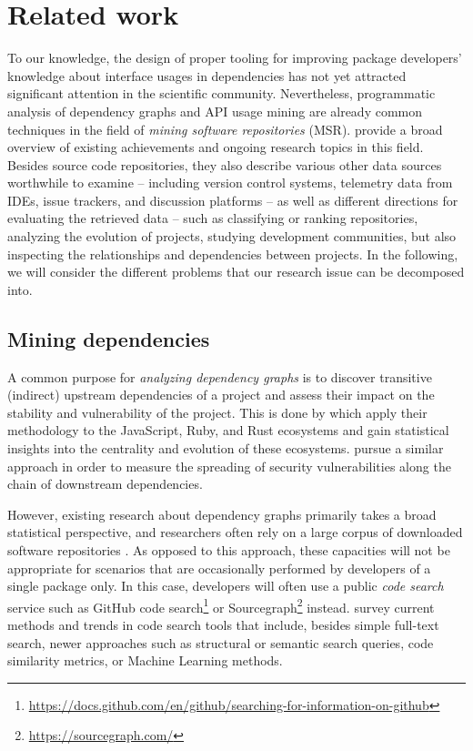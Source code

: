 \section{Related work}
\label{sec:related_work}

To our knowledge, the design of proper tooling for improving package developers' knowledge about interface usages in dependencies has not yet attracted significant attention in the scientific community.
Nevertheless, programmatic analysis of dependency graphs and API usage mining are already common techniques in the field of \emph{mining software repositories} (MSR).
\citet{chaturvedi2013tools} provide a broad overview of existing achievements and ongoing research topics in this field.
Besides source code repositories, they also describe various other data sources worthwhile to examine -- including version control systems, telemetry data from IDEs, issue trackers, and discussion platforms -- as well as different directions for evaluating the retrieved data -- such as classifying or ranking repositories, analyzing the evolution of projects, studying development communities, but also inspecting the relationships and dependencies between projects.
In the following, we will consider the different problems that our research issue can be decomposed into.

\subsection{Mining dependencies}
\label{sec:related_work/dependencies}

A common purpose for \emph{analyzing dependency graphs} is to discover transitive (indirect) upstream dependencies of a project and assess their impact on the stability and vulnerability of the project.
This is done by \citet{kikas2017structure} which apply their methodology to the JavaScript, Ruby, and Rust ecosystems and gain statistical insights into the centrality and evolution of these ecosystems.
\citet{decan2018impact} pursue a similar approach in order to measure the spreading of security vulnerabilities along the chain of downstream dependencies.

However, existing research about dependency graphs primarily takes a broad statistical perspective, and researchers often rely on a large corpus of downloaded software repositories \citep{abdalkareem2017developers,katz2020libraries,kikas2017structure}.
As opposed to this approach, these capacities will not be appropriate for scenarios that are occasionally performed by developers of a single package only.
In this case, developers will often use a public \emph{code search} service such as GitHub code search\footnote{\url{https://docs.github.com/en/github/searching-for-information-on-github}} or Sourcegraph\footnote{\url{https://sourcegraph.com/}} instead.
\citet{liu2020opportunities} survey current methods and trends in code search tools that include, besides simple full-text search, newer approaches such as structural or semantic search queries, code similarity metrics, or Machine Learning methods.

